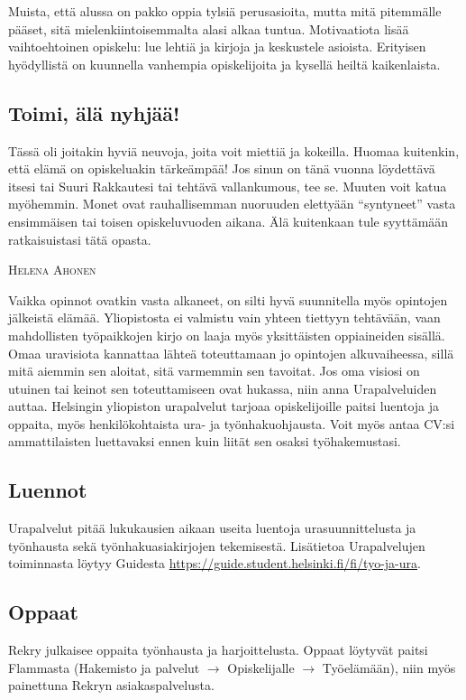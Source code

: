 \documentclass[a5paper, 8pt, twocolumn]{book} %
\numberwithin{equation}{section}
\begin{document}
Muista, että alussa on pakko oppia tylsiä
perusasioita, mutta mitä pitemmälle pääset,
sitä mielenkiintoisemmalta alasi alkaa
tuntua. Motivaatiota lisää vaihtoehtoinen
opiskelu: lue lehtiä ja kirjoja ja keskustele
asioista. Erityisen hyödyllistä on kuunnella
vanhempia opiskelijoita ja kysellä heiltä
kaikenlaista.

\subsection*{Toimi, älä nyhjää!}
Tässä oli joitakin hyviä neuvoja, joita
voit miettiä ja kokeilla. Huomaa kuitenkin,
että elämä on opiskeluakin tärkeämpää! Jos
sinun on tänä vuonna löydettävä itsesi tai
Suuri Rakkautesi tai tehtävä vallankumous,
tee se. Muuten voit katua myöhemmin.
Monet ovat rauhallisemman nuoruuden
elettyään ``syntyneet'' vasta ensimmäisen
tai toisen opiskeluvuoden aikana. Älä kuitenkaan
tule syyttämään ratkaisuistasi tätä
opasta.

\vspace{0.5cm}
\noindent\textsc{Helena Ahonen}

Vaikka opinnot ovatkin vasta alkaneet,
on silti hyvä suunnitella myös opintojen
jälkeistä elämää. Yliopistosta ei valmistu
vain yhteen tiettyyn tehtävään, vaan mahdollisten
työpaikkojen kirjo on laaja myös
yksittäisten oppiaineiden sisällä. Omaa
uravisiota kannattaa lähteä toteuttamaan
jo opintojen alkuvaiheessa, sillä mitä aiemmin
sen aloitat, sitä varmemmin sen tavoitat.
Jos oma visiosi on utuinen tai keinot
sen toteuttamiseen ovat hukassa, niin anna
Urapalveluiden auttaa. Helsingin yliopiston urapalvelut tarjoaa opiskelijoille paitsi luentoja
ja oppaita, myös henkilökohtaista
ura- ja
työnhakuohjausta. Voit myös antaa CV:si
ammattilaisten luettavaksi ennen kuin liität
sen osaksi työhakemustasi.

\subsection*{Luennot}
Urapalvelut pitää lukukausien
aikaan useita luentoja urasuunnittelusta
ja työnhausta sekä työnhakuasiakirjojen
tekemisestä. Lisätietoa Urapalvelujen toiminnasta löytyy Guidesta
\url{https://guide.student.helsinki.fi/fi/tyo-ja-ura}.

\subsection*{Oppaat}
Rekry julkaisee oppaita työnhausta ja
harjoittelusta. Oppaat löytyvät paitsi Flammasta
(Hakemisto ja palvelut $\rightarrow$ Opiskelijalle
$\rightarrow$ Työelämään), niin myös painettuna Rekryn asiakaspalvelusta.
\end{document}
